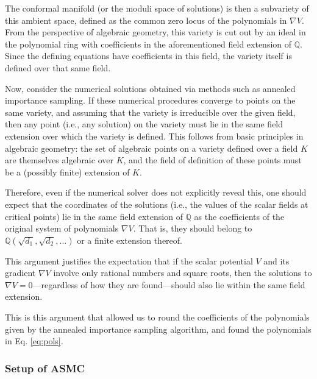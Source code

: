\documentclass[11pt]{article}
\begin{document}
  The conformal manifold (or the moduli space of solutions) is then a subvariety of this ambient space, defined as the common zero locus of the polynomials in $\nabla V$. From the perspective of algebraic geometry, this variety is cut out by an ideal in the polynomial ring with coefficients in the aforementioned field extension of $\mathbb{Q}$. Since the defining equations have coefficients in this field, the variety itself is defined over that same field.
  
  Now, consider the numerical solutions obtained via methods such as annealed importance sampling. If these numerical procedures converge to points on the same variety, and assuming that the variety is irreducible over the given field, then any point (i.e., any solution) on the variety must lie in the same field extension over which the variety is defined. This follows from basic principles in algebraic geometry: the set of algebraic points on a variety defined over a field $K$ are themselves algebraic over $K$, and the field of definition of these points must be a (possibly finite) extension of $K$.
  
  Therefore, even if the numerical solver does not explicitly reveal this, one should expect that the coordinates of the solutions (i.e., the values of the scalar fields at critical points) lie in the same field extension of $\mathbb{Q}$ as the coefficients of the original system of polynomials $\nabla V$. That is, they should belong to $\mathbb{Q}(\sqrt{d_1}, \sqrt{d_2}, \dots)$ or a finite extension thereof.
  
  This argument justifies the expectation that if the scalar potential $V$ and its gradient $\nabla V$ involve only rational numbers and square roots, then the solutions to $\nabla V = 0$—regardless of how they are found—should also lie within the same field extension.
  
 This is this argument that allowed us to round the coefficients of the polynomials given by the annealed importance sampling algorithm, and found the polynomials in Eq. \eqref{eq:pols}.
 
 \subsubsection{Setup of ASMC}
\end{document}
